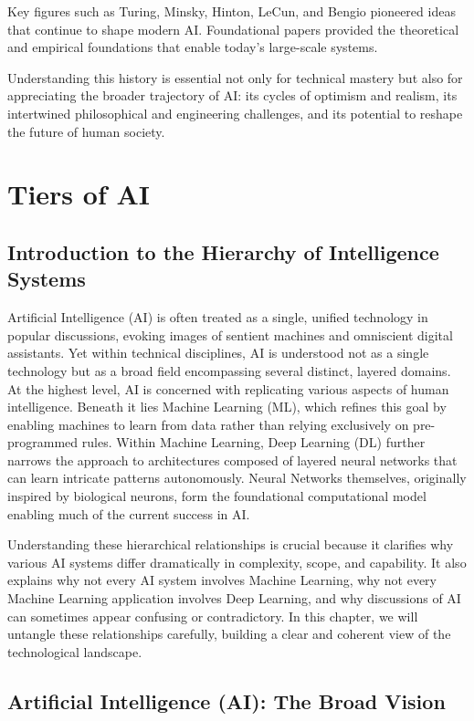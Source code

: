 \documentclass[openany]{book}
\begin{document}
Key figures such as Turing, Minsky, Hinton, LeCun, and Bengio pioneered ideas 
that continue to shape modern AI. Foundational papers provided the theoretical 
and empirical foundations that enable today's large-scale systems.

Understanding this history is essential not only for technical mastery but also 
for appreciating the broader trajectory of AI: its cycles of optimism and 
realism, its intertwined philosophical and engineering challenges, and its 
potential to reshape the future of human society.

\chapter{Tiers of AI}

\section{Introduction to the Hierarchy of Intelligence Systems}

Artificial Intelligence (AI) is often treated as a single, unified technology in
popular discussions, evoking images of sentient machines and omniscient digital 
assistants. Yet within technical disciplines, AI is understood not as a single 
technology but as a broad field encompassing several distinct, layered domains. 
At the highest level, AI is concerned with replicating various aspects of human 
intelligence. Beneath it lies Machine Learning (ML), which refines this goal by 
enabling machines to learn from data rather than relying exclusively on 
pre-programmed rules. Within Machine Learning, Deep Learning (DL) further 
narrows the approach to architectures composed of layered neural networks that 
can learn intricate patterns autonomously. Neural Networks themselves, 
originally inspired by biological neurons, form the foundational computational 
model enabling much of the current success in AI.

Understanding these hierarchical relationships is crucial because it clarifies 
why various AI systems differ dramatically in complexity, scope, and capability.
It also explains why not every AI system involves Machine Learning, why not 
every Machine Learning application involves Deep Learning, and why discussions 
of AI can sometimes appear confusing or contradictory. In this chapter, we will 
untangle these relationships carefully, building a clear and coherent view of 
the technological landscape.

\section{Artificial Intelligence (AI): The Broad Vision}
\end{document}
